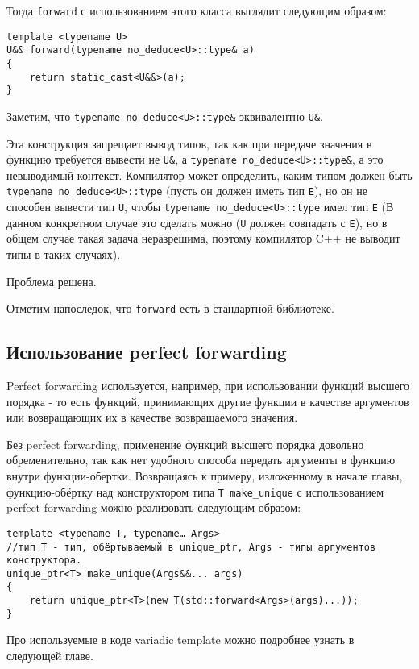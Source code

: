 Тогда \texttt{forward} с использованием этого класса выглядит следующим образом:

\begin{verbatim}
template <typename U>
U&& forward(typename no_deduce<U>::type& a)
{
	return static_cast<U&&>(a);
}
\end{verbatim}

Заметим, что \texttt{typename no_deduce<U>::type&} эквивалентно \texttt{U&}.

Эта конструкция запрещает вывод типов, так как при передаче значения в функцию требуется вывести не \texttt{U&}, а \texttt{typename no_deduce<U>::type&}, а это невыводимый контекст. Компилятор может определить, каким типом должен быть \texttt{typename no_deduce<U>::type} (пусть он должен иметь тип \texttt{E}), но он не способен вывести тип \texttt{U}, чтобы \texttt{typename no_deduce<U>::type} имел тип \texttt{E} (В данном конкретном случае это сделать можно (\texttt{U} должен совпадать с \texttt{E}), но в общем случае такая задача неразрешима, поэтому компилятор C++ не выводит типы в таких случаях).

Проблема решена.

Отметим напоследок, что \texttt{forward} есть в стандартной библиотеке.

\subsection{Использование perfect forwarding}

Perfect forwarding используется, например, при использовании функций высшего порядка - то есть функций, принимающих другие функции в качестве аргументов или возвращающих их в качестве возвращаемого значения.

Без perfect forwarding, применение функций высшего порядка довольно обременительно, так как нет удобного способа передать аргументы в функцию внутри функции-обертки.
Возвращаясь к примеру, изложенному в начале главы, функцию-обёртку над конструктором типа \texttt{T make_unique} с использованием perfect forwarding  можно реализовать следующим образом:

\begin{verbatim}
template <typename T, typename… Args>
//тип T - тип, обёртываемый в unique_ptr, Args - типы аргументов конструктора.
unique_ptr<T> make_unique(Args&&... args)
{
	return unique_ptr<T>(new T(std::forward<Args>(args)...));
}
\end{verbatim}

Про используемые в коде variadic template можно подробнее узнать в следующей главе.